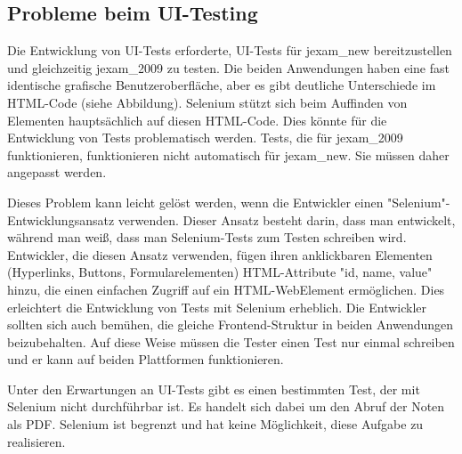 \subsection{Probleme beim UI-Testing}


Die Entwicklung von UI-Tests erforderte, UI-Tests für \gls{jexam_new}
bereitzustellen und gleichzeitig \gls{jexam_2009} zu testen. Die beiden
Anwendungen haben eine fast identische grafische Benutzeroberfläche,
aber es gibt deutliche Unterschiede im HTML-Code (siehe Abbildung).
Selenium stützt sich beim Auffinden von Elementen hauptsächlich auf
diesen HTML-Code. Dies könnte für die Entwicklung von Tests
problematisch werden. Tests, die für \gls{jexam_2009} funktionieren,
funktionieren  nicht automatisch  für \gls{jexam_new}. Sie müssen daher
angepasst werden.


Dieses Problem kann leicht gelöst werden, wenn die Entwickler
einen "Selenium"-Entwicklungsansatz verwenden. Dieser Ansatz
besteht darin, dass man entwickelt, während man weiß, dass man
Selenium-Tests zum Testen schreiben wird. Entwickler, die diesen
Ansatz verwenden, fügen ihren anklickbaren Elementen (Hyperlinks,
Buttons, Formularelementen) HTML-Attribute "id, name, value" hinzu,
die einen einfachen Zugriff auf ein HTML-WebElement ermöglichen.
Dies erleichtert die Entwicklung von Tests mit Selenium erheblich.
Die Entwickler sollten sich auch bemühen, die gleiche
Frontend-Struktur in beiden Anwendungen beizubehalten. Auf diese
Weise müssen die Tester einen Test nur einmal schreiben und er
kann auf beiden Plattformen funktionieren.

Unter den Erwartungen an UI-Tests gibt es einen bestimmten Test,
der mit Selenium nicht durchführbar ist. Es handelt sich dabei um
den Abruf der Noten als PDF. Selenium ist begrenzt und hat keine
Möglichkeit, diese Aufgabe zu realisieren.

